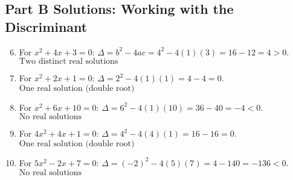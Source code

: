 \documentclass[12pt]{article}
\begin{document}
\subsection*{Part B Solutions: Working with the Discriminant}
\begin{enumerate}
  \setcounter{enumi}{5}
  \item For \(x^2 + 4x + 3 = 0\):  
  \(\Delta = b^2 - 4ac = 4^2 - 4(1)(3) = 16 - 12 = 4 > 0.\)  
  \(\boxed{\text{Two distinct real solutions}}\)

  \item For \(x^2 + 2x + 1 = 0\):  
  \(\Delta = 2^2 - 4(1)(1) = 4 - 4 = 0.\)  
  \(\boxed{\text{One real solution (double root)}}\)

  \item For \(x^2 + 6x + 10 = 0\):  
  \(\Delta = 6^2 - 4(1)(10) = 36 - 40 = -4 < 0.\)  
  \(\boxed{\text{No real solutions}}\)

  \item For \(4x^2 + 4x + 1 = 0\):  
  \(\Delta = 4^2 - 4(4)(1) = 16 - 16 = 0.\)  
  \(\boxed{\text{One real solution (double root)}}\)

  \item For \(5x^2 - 2x + 7 = 0\):  
  \(\Delta = (-2)^2 - 4(5)(7) = 4 - 140 = -136 < 0.\)  
  \(\boxed{\text{No real solutions}}\)
\end{enumerate}
\end{document}
